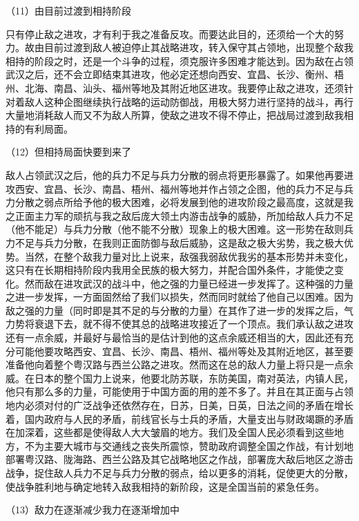 \documentclass[UTF8, 12pt, a4paper]{ctexrep}
\begin{document}
（11）由目前过渡到相持阶段

只有停止敌之进攻，才有利于我之准备反攻。而要达此目的，还须给一个大的努力。故由目前过渡到敌人被迫停止其战略进攻，转入保守其占领地，出现整个敌我相持的阶段之时，还是一个斗争的过程，须克服许多困难才能达到。因为敌在占领武汉之后，还不会立即结束其进攻，他必定还想向西安、宜昌、长沙、衡州、梧州、北海、南昌、汕头、福州等地及其附近地区进攻。我要停止敌之进攻，还须针对着敌人这种企图继续执行战略的运动防御战，用极大努力进行坚持的战斗，再行大量地消耗敌人而又不为敌人所算，使敌之进攻不得不停止，把战局过渡到敌我相持的有利局面。

（12）但相持局面快要到来了

敌人占领武汉之后，他的兵力不足与兵力分散的弱点将更形暴露了。如果他再要进攻西安、宜昌、长沙、南昌、梧州、福州等地并作占领之企图，他的兵力不足与兵力分散之弱点所给予他的极大困难，必将发展到他的进攻阶段之最高度，这就是我之正面主力军的顽抗与我之敌后庞大领土内游击战争的威胁，所加给敌人兵力不足（他不能足）与兵力分散（他不能不分散）现象上的极大困难。这一形势在敌则兵力不足与兵力分散，在我则正面防御与敌后威胁，这是敌之极大劣势，我之极大优势。当然，在整个敌我力量对比上说来，敌强我弱敌优我劣的基本形势并未变化，这只有在长期相持阶段内我用全民族的极大努力，并配合国外条件，才能使之变化。然而敌在进攻武汉的战斗中，他之强的力量已经进一步发挥了。这种强的力量之进一步发挥，一方面固然给了我们以损失，然而同时就给了他自己以困难。因为敌之强的力量（同时即是其不足的与分散的力量）在其作了进一步的发挥之后，气力势将衰退下去，就不得不使其总的战略进攻接近了一个顶点。我们承认敌之进攻还有一点余威，并最好与最恰当的是估计到他的这点余威还相当的大，因此还有充分可能他要攻略西安、宜昌、长沙、南昌、梧州、福州等处及其附近地区，甚至要准备他向着整个粤汉路与西兰公路之进攻。然而这在总的敌人力量上将只是一点余威。在日本的整个国力上说来，他要北防苏联，东防美国，南对英法，内镇人民，他只有那么多的力量，可能使用于中国方面的用的差不多了。并且在其正面与占领地内必须对付的广泛战争还依然存在，日苏，日美，日英，日法之间的矛盾在增长着，国内政府与人民的矛盾，前线官长与士兵的矛盾，大量支出与财政竭蹶的矛盾在加深着，这些都是使得敌人大大皱眉的地方。我们及全国人民必须看到这些地方，不为主要大城市与交通线之丧失所震惊，赞助政府调整全国之作战，有计划地部署粤汉路、陇海路、西兰公路及其它战略地区之作战，部署庞大敌后地区之游击战争，捉住敌人兵力不足与兵力分散的弱点，给以更多的消耗，促使更大的分散，使战争胜利地与确定地转入敌我相持的新阶段，这是全国当前的紧急任务。

（13）敌力在逐渐减少我力在逐渐增加中
\end{document}
